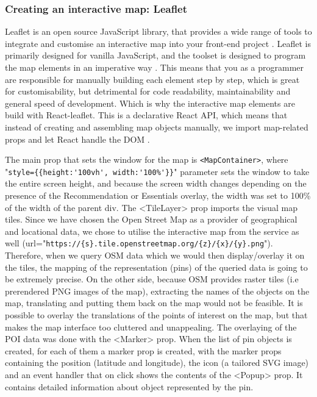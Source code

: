 \subsubsection{Creating an interactive map: Leaflet}

Leaflet is an open source JavaScript library, that provides a wide range of tools to integrate and customise an interactive map into your front-end project \cite{leafletMainPage}. Leaflet is primarily designed for vanilla JavaScript, and the toolset is designed to program the map elements in an imperative way \cite{LeafletImperative}. This means that you as a programmer are responsible for manually building each element step by step, which is great for customisability, but detrimental for code readability, maintainability and general speed of development. Which is why the interactive map elements are build with React-leaflet. This is a declarative React API, which means that instead of creating and assembling map objects manually, we import map-related props and let React handle the DOM \cite{LeafletDeclarative}.

The main prop that sets the window for the map is \texttt{<MapContainer>}, where "\lstinline|style={{height:'100vh', width:'100%'}}|" parameter sets the window to take the entire screen height, and because the screen width changes depending on the presence of the Recommendation or Essentials overlay, the width was set to 100\% of the width of the parent div. The <TileLayer> prop imports the visual map tiles. Since we have chosen the Open Street Map as a provider of geographical and locational data, we chose to utilise the interactive map from the service as well (url="\lstinline|https://{s}.tile.openstreetmap.org/{z}/{x}/{y}.png|"). Therefore, when we query OSM data which we would then display/overlay it on the tiles, the mapping of the representation (pins) of the queried data is going to be extremely precise. On the other side, because OSM provides raster tiles (i.e prerendered PNG images of the map), extracting the names of the objects on the map, translating and putting them back on the map would not be feasible. It is possible to overlay the translations of the points of interest on the map, but that makes the map interface too cluttered and unappealing. The overlaying of the POI data was done with the <Marker> prop. When the list of pin objects is created, for each of them a marker prop is created, with the marker props containing the position (latitude and longitude), the icon (a tailored SVG image) and an event handler that on click shows the contents of the <Popup> prop. It contains detailed information about object represented by the pin.


